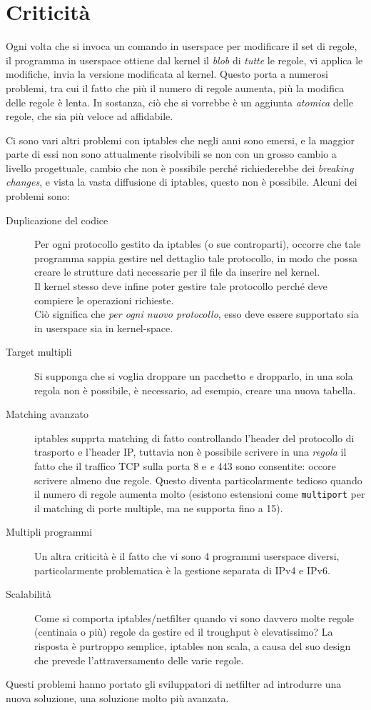 \section{Criticità}
Ogni volta che si invoca un comando in userspace per modificare il set
di regole, il programma in userspace ottiene dal kernel il \textit{blob}
di \textit{tutte} le regole, vi applica le modifiche, invia la versione
modificata al kernel.
Questo porta a numerosi problemi, tra cui il fatto che più il numero di regole
aumenta, più la modifica delle regole è lenta. In sostanza, ciò che
si vorrebbe è un aggiunta \textit{atomica} delle regole, che sia
più veloce ad affidabile.

Ci sono vari altri problemi con iptables che negli anni sono emersi, e la
maggior parte di essi non sono attualmente risolvibili se non con un grosso
cambio a livello progettuale, cambio che non è possibile perché richiederebbe
dei \textit{breaking changes}, e vista la vasta diffusione di iptables, questo
non è possibile.
Alcuni dei problemi sono:
\begin{description}
  \item[Duplicazione del codice] Per ogni protocollo gestito da iptables (o sue
  controparti), occorre che tale programma sappia gestire nel dettaglio
  tale protocollo, in modo che possa creare le strutture dati necessarie per
  il file da inserire nel kernel.\\
  Il kernel stesso deve infine poter gestire tale protocollo perché deve
  compiere le operazioni richieste.\\
  Ciò significa che \textit{per ogni nuovo protocollo}, esso deve essere
  supportato sia in userspace sia in kernel-space.
  \item[Target multipli]Si supponga che si voglia droppare un pacchetto
  \textit{e} dropparlo, in una sola regola non è possibile, è necessario, ad
  esempio, creare una nuova tabella.
  \item[Matching avanzato]iptables supprta matching di fatto controllando l'header
  del protocollo di trasporto e l'header IP, tuttavia non è possibile scrivere
  in una \textit{regola} il fatto che il traffico TCP sulla porta 8 e \textit{e}
  443 sono consentite: occore scrivere almeno due regole. Questo diventa
  particolarmente tedioso quando il numero di regole aumenta molto (esistono
  estensioni come \texttt{multiport} per il matching di porte multiple, ma ne
  supporta fino a 15).
  \item[Multipli programmi]Un altra criticità è il fatto che vi sono 4 programmi
  userspace diversi, particolarmente problematica è la gestione separata di IPv4
  e IPv6.
  \item[Scalabilità]Come si comporta iptables/netfilter quando vi sono
  davvero molte regole (centinaia o più) regole da gestire ed il troughput
  è elevatissimo? La risposta è purtroppo semplice, iptables non scala, a causa
  del suo design che prevede l'attraversamento delle varie regole.
\end{description}

Questi problemi hanno portato gli sviluppatori di netfilter ad introdurre
una nuova soluzione, una soluzione molto più avanzata.
